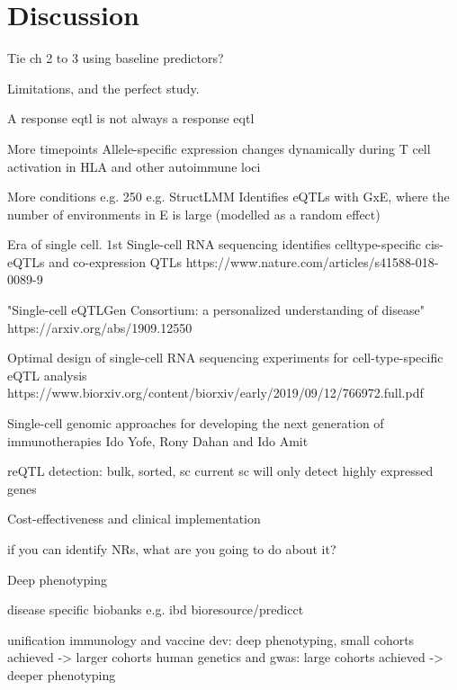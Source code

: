 %
%

\chapter{Discussion}

Tie ch 2 to 3 using baseline predictors?

Limitations, and the perfect study.

A response eqtl is not always a response eqtl

More timepoints
Allele-specific expression changes dynamically during T cell activation in HLA and other autoimmune loci

More conditions
e.g. 250
e.g. StructLMM 
    Identifies eQTLs with GxE, where the number of environments in E is large (modelled as a random effect)

Era of single cell.
    1st
    Single-cell RNA sequencing identifies celltype-specific cis-eQTLs and co-expression QTLs
    https://www.nature.com/articles/s41588-018-0089-9

    "Single-cell eQTLGen Consortium: a personalized understanding of disease"
    https://arxiv.org/abs/1909.12550

    Optimal design of single-cell RNA sequencing experiments for cell-type-specific eQTL analysis
    https://www.biorxiv.org/content/biorxiv/early/2019/09/12/766972.full.pdf

    Single-cell genomic approaches for developing the next generation of immunotherapies Ido Yofe, Rony Dahan and Ido Amit


    reQTL detection: bulk, sorted, sc
    current sc will only detect highly expressed genes

Cost-effectiveness and clinical implementation

    if you can identify NRs, what are you going to do about it?

Deep phenotyping
    
    disease specific biobanks e.g. ibd bioresource/predicct

unification
    immunology and vaccine dev: deep phenotyping, small cohorts achieved -> larger cohorts
    human genetics and gwas: large cohorts achieved -> deeper phenotyping

